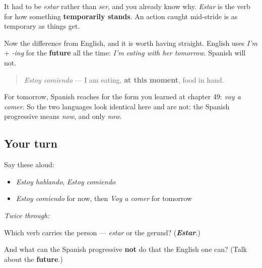 \begin{culture}
It had to be \emph{estar} rather than \emph{ser}, and you already know why. \emph{Estar} is the verb for how something \textbf{temporarily stands}. An action caught mid-stride is as temporary as things get.

Now the difference from English, and it is worth having straight. English uses \emph{I'm} + \emph{-ing} for the \textbf{future} all the time: \emph{I'm eating with her tomorrow}. Spanish will not.

\begin{quote}
\emph{Estoy comiendo} — I am eating, \textbf{at this moment}, food in hand.
\end{quote}

For tomorrow, Spanish reaches for the form you learned at chapter 49: \emph{voy a comer}. So the two languages look identical here and are not: the Spanish progressive means \emph{now}, and only \emph{now}.
\end{culture}

\subsection*{Your turn}
Say these aloud:

\begin{itemize}
\raggedright
  \item \emph{Estoy hablando}, \emph{Estoy comiendo}
  \item \emph{Estoy comiendo} for now, then \emph{Voy a comer} for tomorrow
\end{itemize}

\emph{Twice through:}

\begin{tcolorbox}[breakable,colback=teal!4,colframe=teal!35!black,title={Before you move on}]
Which verb carries the person — \emph{estar} or the gerund? (\emph{\textbf{Estar}}.)

And what can the Spanish progressive \textbf{not} do that the English one can? (Talk about the \textbf{future}.)
\end{tcolorbox}

